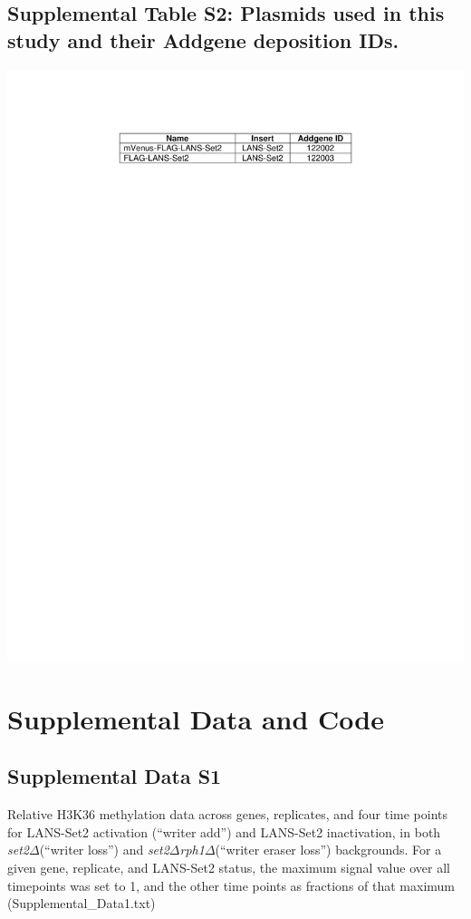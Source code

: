 \documentclass[11pt]{biorxiv}
\newcommand{\setdelt}{\emph{set2$\Delta$}\xspace}
\newcommand{\setdeltrphdelt}{\emph{set2$\Delta$rph1$\Delta$}\xspace}
\begin{document}
\subsection{Supplemental Table S2: Plasmids used in this study and their Addgene deposition IDs.}
\begin{table}[ht!]
\center
\includegraphics[width=\textwidth, trim={0in 9in 0in 1in}, clip]{tables/Supplemental_Table2.pdf}
\end{table}
 
\clearpage

\section{Supplemental Data and Code}

\subsection{Supplemental Data S1}

Relative H3K36 methylation data across genes, replicates, and four time points for LANS-Set2 activation (``writer add'') and LANS-Set2 inactivation, in both \setdelt (``writer loss'') and \setdeltrphdelt (``writer eraser loss'') backgrounds. For a given gene,  replicate, and LANS-Set2 status, the maximum signal value over all timepoints was set to 1, and the other time points as fractions of that maximum (Supplemental\_Data1.txt)
\end{document}
